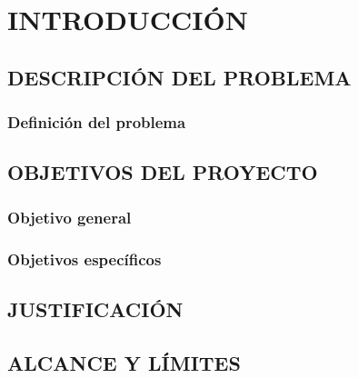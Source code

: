 \chapter{INTRODUCCIÓN}\label{chap:intro}

\section{DESCRIPCIÓN DEL PROBLEMA}

\subsection{Definición del problema}

\section{OBJETIVOS DEL PROYECTO}%

\subsection{Objetivo general}

\subsection{Objetivos específicos}

\section{JUSTIFICACIÓN}

\section{ALCANCE Y LÍMITES}

